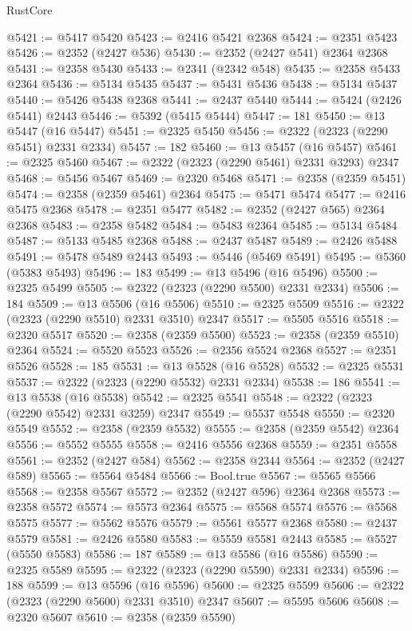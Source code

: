 \begin{lexlean}{RustCore}
\begin{coremodule}
@5421 := @5417 @5420
@5423 := @2416 @5421 @2368
@5424 := @2351 @5423
@5426 := @2352 (@2427 @536)
@5430 := @2352 (@2427 @541) @2364 @2368
@5431 := @2358 @5430
@5433 := @2341 (@2342 @548)
@5435 := @2358 @5433 @2364
@5436 := @5134 @5435
@5437 := @5431 @5436
@5438 := @5134 @5437
@5440 := @5426 @5438 @2368
@5441 := @2437 @5440
@5444 := @5424 (@2426 @5441) @2443
@5446 := @5392 (@5415 @5444)
@5447 := 181
@5450 := @13 @5447 (@16 @5447)
@5451 := @2325 @5450
@5456 := @2322 (@2323 (@2290 @5451) @2331 @2334)
@5457 := 182
@5460 := @13 @5457 (@16 @5457)
@5461 := @2325 @5460
@5467 := @2322 (@2323 (@2290 @5461) @2331 @3293) @2347
@5468 := @5456 @5467
@5469 := @2320 @5468
@5471 := @2358 (@2359 @5451)
@5474 := @2358 (@2359 @5461) @2364
@5475 := @5471 @5474
@5477 := @2416 @5475 @2368
@5478 := @2351 @5477
@5482 := @2352 (@2427 @565) @2364 @2368
@5483 := @2358 @5482
@5484 := @5483 @2364
@5485 := @5134 @5484
@5487 := @5133 @5485 @2368
@5488 := @2437 @5487
@5489 := @2426 @5488
@5491 := @5478 @5489 @2443
@5493 := @5446 (@5469 @5491)
@5495 := @5360 (@5383 @5493)
@5496 := 183
@5499 := @13 @5496 (@16 @5496)
@5500 := @2325 @5499
@5505 := @2322 (@2323 (@2290 @5500) @2331 @2334)
@5506 := 184
@5509 := @13 @5506 (@16 @5506)
@5510 := @2325 @5509
@5516 := @2322 (@2323 (@2290 @5510) @2331 @3510) @2347
@5517 := @5505 @5516
@5518 := @2320 @5517
@5520 := @2358 (@2359 @5500)
@5523 := @2358 (@2359 @5510) @2364
@5524 := @5520 @5523
@5526 := @2356 @5524 @2368
@5527 := @2351 @5526
@5528 := 185
@5531 := @13 @5528 (@16 @5528)
@5532 := @2325 @5531
@5537 := @2322 (@2323 (@2290 @5532) @2331 @2334)
@5538 := 186
@5541 := @13 @5538 (@16 @5538)
@5542 := @2325 @5541
@5548 := @2322 (@2323 (@2290 @5542) @2331 @3259) @2347
@5549 := @5537 @5548
@5550 := @2320 @5549
@5552 := @2358 (@2359 @5532)
@5555 := @2358 (@2359 @5542) @2364
@5556 := @5552 @5555
@5558 := @2416 @5556 @2368
@5559 := @2351 @5558
@5561 := @2352 (@2427 @584)
@5562 := @2358 @2344
@5564 := @2352 (@2427 @589)
@5565 := @5564 @5484
@5566 := Bool.true
@5567 := @5565 @5566
@5568 := @2358 @5567
@5572 := @2352 (@2427 @596) @2364 @2368
@5573 := @2358 @5572
@5574 := @5573 @2364
@5575 := @5568 @5574
@5576 := @5568 @5575
@5577 := @5562 @5576
@5579 := @5561 @5577 @2368
@5580 := @2437 @5579
@5581 := @2426 @5580
@5583 := @5559 @5581 @2443
@5585 := @5527 (@5550 @5583)
@5586 := 187
@5589 := @13 @5586 (@16 @5586)
@5590 := @2325 @5589
@5595 := @2322 (@2323 (@2290 @5590) @2331 @2334)
@5596 := 188
@5599 := @13 @5596 (@16 @5596)
@5600 := @2325 @5599
@5606 := @2322 (@2323 (@2290 @5600) @2331 @3510) @2347
@5607 := @5595 @5606
@5608 := @2320 @5607
@5610 := @2358 (@2359 @5590)

\end{coremodule}
\end{lexlean}
